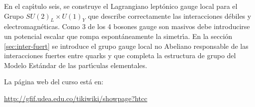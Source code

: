 En el cap\'\i tulo seis, se construye el Lagrangiano lept\'onico gauge local para el Grupo $SU(2)_L\times U(1)_Y$ que describe correctamente las interacciones d\'ebiles y electromagn\'eticas. Como 3 de los 4 bosones gauge son masivos debe introducirse un potencial escalar que rompa espont\'aneamente la simetr\'\i a. En la secci\'on \ref{sec:inter-fuert} se introduce el grupo gauge local no Abeliano responsable de las interacciones fuertes entre quarks y que completa la estructura de grupo del Modelo Est\'andar de las part\'\i culas elementales. 

La p\'agina web del curso est\'a en:

\url{http://gfif.udea.edu.co/tikiwiki/showpage?htcc} %





